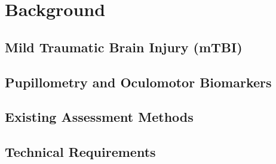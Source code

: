 \chapter{Background}
\label{chapter:background}




\section{Mild Traumatic Brain Injury (mTBI)}



\section{Pupillometry and Oculomotor Biomarkers}



\section{Existing Assessment Methods}



\section{Technical Requirements}

